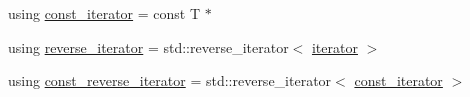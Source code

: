 \begin{DoxyCompactItemize}
\item 
using \mbox{\hyperlink{classmage_1_1_static_memory_buffer_aa871d2967d2e9f4219ab47c16563e328}{const\+\_\+iterator}} = const T $\ast$
\item 
using \mbox{\hyperlink{classmage_1_1_static_memory_buffer_a2ea67615d569f1eecb101f4fbe3eb6a7}{reverse\+\_\+iterator}} = std\+::reverse\+\_\+iterator$<$ \mbox{\hyperlink{classmage_1_1_static_memory_buffer_abeee1c933cd54117e1a92de4a1cc698f}{iterator}} $>$
\item 
using \mbox{\hyperlink{classmage_1_1_static_memory_buffer_afcde56a284e78597f2b331fc9bf379e8}{const\+\_\+reverse\+\_\+iterator}} = std\+::reverse\+\_\+iterator$<$ \mbox{\hyperlink{classmage_1_1_static_memory_buffer_aa871d2967d2e9f4219ab47c16563e328}{const\+\_\+iterator}} $>$
\end{DoxyCompactItemize}
